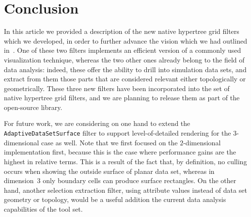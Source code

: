 \section{Conclusion}
\label{s:conclusion}
In this article we provided a description of the new native hypertree
grid filters which we developed, in order to further advance the
vision which we had outlined in~\cite{harel:17}.
One of these two filters implements an efficient version of a commonly
used visualization technique, whereas the two other ones already
belong to the field of data analysis: indeed, these offer the ability
to drill into simulation data sets, and extract from them those parts
that are considered relevant either topologically or geometrically.
These three new filters have been incorporated into the set of native
hypertree grid filters, and we are planning to release them as part of
the open-source \VTK{} library.

For future work, we are considering on one hand to extend the
\texttt{AdaptiveDataSetSurface} filter to support level-of-detailed
rendering for the $3$-dimensional case as well.
Note that we first focused on the $2$-dimensional implementation
first, because this is the case where performance gains are the
highest in relative terms.
This is a result of the fact that, by definition, no culling occurs
when showing the outside surface of planar data set, whereas in
dimension~$3$ only boundary cells can produce surface rectangles.
On the other hand, another selection extraction filter, using
attribute values instead of data set geometry or topology, would be a
useful addition the current data analysis capabilities of the tool set.
